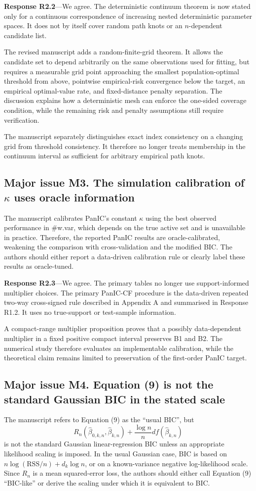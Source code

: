 \documentclass[11pt]{article}
\newcommand{\response}[1]{\par\noindent\textbf{Response #1}---}
\begin{document}
\response{R2.2}We agree. The deterministic continuum theorem is now stated only for a continuous correspondence of increasing nested deterministic parameter spaces. It does not by itself cover random path knots or an $n$-dependent candidate list.

The revised manuscript adds a random-finite-grid theorem. It allows the candidate set to depend arbitrarily on the same observations used for fitting, but requires a measurable grid point approaching the smallest population-optimal threshold from above, pointwise empirical-risk convergence below the target, an empirical optimal-value rate, and fixed-distance penalty separation. The discussion explains how a deterministic mesh can enforce the one-sided coverage condition, while the remaining risk and penalty assumptions still require verification.

The manuscript separately distinguishes exact index consistency on a changing grid from threshold consistency. It therefore no longer treats membership in the continuum interval as sufficient for arbitrary empirical path knots.

\subsection*{Major issue M3. The simulation calibration of $\kappa$ uses oracle information}
The manuscript calibrates PanIC's constant $\kappa$ using the best observed performance in \#w.var, which depends on the true active set and is unavailable in practice. Therefore, the reported PanIC results are oracle-calibrated, weakening the comparison with cross-validation and the modified BIC. The authors should either report a data-driven calibration rule or clearly label these results as oracle-tuned.

\response{R2.3}We agree. The primary tables no longer use support-informed multiplier choices. The primary PanIC-CF procedure is the data-driven repeated two-way cross-signed rule described in Appendix A and summarised in Response R1.2. It uses no true-support or test-sample information.

A compact-range multiplier proposition proves that a possibly data-dependent multiplier in a fixed positive compact interval preserves B1 and B2. The numerical study therefore evaluates an implementable calibration, while the theoretical claim remains limited to preservation of the first-order PanIC target.

\subsection*{Major issue M4. Equation (9) is not the standard Gaussian BIC in the stated scale}
The manuscript refers to Equation (9) as the ``usual BIC'', but
\[
R_n(\widehat\beta_{0,k,n},\widehat\beta_{k,n})+\frac{\log n}{n}df(\widehat\beta_{k,n})
\]
is not the standard Gaussian linear-regression BIC unless an appropriate likelihood scaling is imposed. In the usual Gaussian case, BIC is based on $n\log(\mathrm{RSS}/n)+d_k\log n$, or on a known-variance negative log-likelihood scale. Since $R_n$ is a mean squared-error loss, the authors should either call Equation (9) ``BIC-like'' or derive the scaling under which it is equivalent to BIC.
\end{document}
